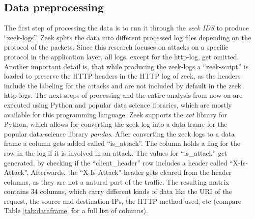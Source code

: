 \documentclass[
    fontsize=12pt,
    headings=small,
    parskip=half,           %
    bibliography=totoc,
    numbers=noenddot,       %
    open=any,               %
    ]{scrreprt}
\begin{document}
\subsection{Data preprocessing}
\label{subsec:dataset}
The first step of processing the data is to run it through the \emph{zeek IDS} to produce ``zeek-logs''. Zeek splits the data into different processed log files depending on the protocol of the packets. Since this research focuses on attacks on a specific protocol in the application layer, all logs, except for the http-log, get omitted. Another important detail is, that while producing the zeek-logs a ``zeek-script'' is loaded to preserve the HTTP headers in the HTTP log of zeek, as the headers include the labeling for the attacks and are not included by default in the zeek http-logs. The next steps of processing and the entire analysis from now on are executed using Python and popular data science libraries, which are mostly available for this programming language. Zeek supports the \emph{zat} library for Python, which allows for converting the zeek log into a data frame for the popular data-science library \emph{pandas}. After converting the zeek logs to a data frame a column gets added called ``is\_attack''. The column holds a flag for the row in the log if it is involved in an attack. The values for ``is\_attack'' get generated, by checking if the ``client\_header'' row includes a header called ``X-Is-Attack''. Afterwards, the ``X-Is-Attack''-header gets cleared from the header columns, as they are not a natural part of the traffic. The resulting matrix contains 34 columns, which carry different kinds of data like the URI of the request, the source and destination IPs, the HTTP method used, etc (compare Table \ref{tab:dataframe} for a full list of columns).
\end{document}

